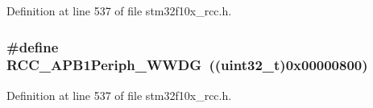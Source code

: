 Definition at line 537 of file stm32f10x\+\_\+rcc.\+h.

\subsubsection[{\texorpdfstring{R\+C\+C\+\_\+\+A\+P\+B1\+Periph\+\_\+\+W\+W\+DG}{RCC_APB1Periph_WWDG}}]{\setlength{\rightskip}{0pt plus 5cm}\#define R\+C\+C\+\_\+\+A\+P\+B1\+Periph\+\_\+\+W\+W\+DG~(({\bf uint32\+\_\+t})0x00000800)}\hypertarget{group___a_p_b1__peripheral_gad84e40be78ddc40b8eae1c2b0898f6b1}{}\label{group___a_p_b1__peripheral_gad84e40be78ddc40b8eae1c2b0898f6b1}


Definition at line 537 of file stm32f10x\+\_\+rcc.\+h.

